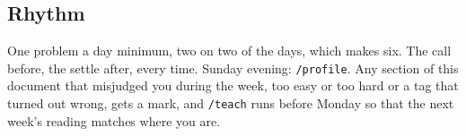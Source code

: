 \subsection*{Rhythm}

One problem a day minimum, two on two of the days, which makes six. The call before, the settle after, every time. Sunday evening: \texttt{/profile}. Any section of this document that misjudged you during the week, too easy or too hard or a tag that turned out wrong, gets a mark, and \texttt{/teach} runs before Monday so that the next week's reading matches where you are.
